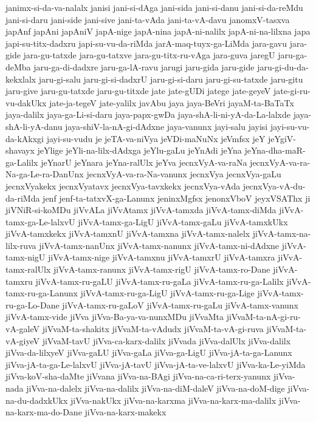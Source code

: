{janimx-si-da-va-nalalx
janisi
jani-si-dAga
jani-sida
jani-si-danu
jani-si-da-reMdu
jani-si-daru
jani-side
jani-sive
jani-ta-vAda
jani-ta-vA-davu
janomxV-tasxva
japAnf
japAni
japAniV
japA-nige
japA-nina
japA-ni-nalilx
japA-ni-na-lilxna
japa
japi-su-titx-dadxru
japi-su-vu-da-riMda
jarA-maq-tuyx-ga-LiMda
jara-gavu
jara-gide
jara-gu-tatxde
jara-gu-tatxve
jara-gu-titx-ru-vAga
jara-guva
jaregU
jaru-ga-deMba
jaru-ga-di-dadxre
jaru-ga-lA-ravu
jarugi
jaru-gida
jaru-gide
jaru-gi-du-da-kekxlalx
jaru-gi-salu
jaru-gi-si-dadxrU
jaru-gi-si-daru
jaru-gi-su-tatxde
jaru-gitu
jaru-give
jaru-gu-tatxde
jaru-gu-titxde
jate
jate-gUDi
jatege
jate-geyeV
jate-gi-ru-vu-dakUkx
jate-ja-tegeV
jate-yalilx
javAbu
jaya
jaya-BeVri
jayaM-ta-BaTaTx
jaya-dalilx
jaya-ga-Li-si-daru
jaya-papx-gwDa
jaya-shA-li-ni-yA-da-La-lalxde
jaya-shA-li-yA-danu
jaya-shiV-la-nA-gi-dAdxne
jaya-vanunx
jayi-salu
jayisi
jayi-su-vu-da-kAkxgi
jayi-su-vudu
je
jeTA-va-niVya
jeVDi-maNuNx
jeVmfsx
jeY
jeYgiV-shavayx
jeYlige
jeYli-na-lilx-dAdxga
jeYlu-gaLu
jeYnAdi
jeYna
jeYna-dha-maR-ga-Lalilx
jeYnarU
jeYnara
jeYna-ralUlx
jeYva
jecnxVyA-va-raNa
jecnxVyA-va-ra-Na-ga-Le-ra-DanUnx
jecnxVyA-va-ra-Na-vanunx
jecnxVya
jecnxVya-gaLu
jecnxVyakekx
jecnxVyatavx
jecnxVya-tavxkekx
jecnxVya-vAda
jecnxVya-vA-du-da-riMda
jenf
jenf-ta-tatxvX-ga-Lanunx
jeninxMgfsx
jenonxVboV
jeyxVSAThx
ji
jiVNiR-si-koMDu
jiVvALa
jiVvAtamx
jiVvA-tamxda
jiVvA-tamx-diMda
jiVvA-tamx-ga-Le-lalxvU
jiVvA-tamx-ga-LigU
jiVvA-tamx-gaLu
jiVvA-tamxkUkx
jiVvA-tamxkekx
jiVvA-tamxnU
jiVvA-tamxna
jiVvA-tamx-nalelx
jiVvA-tamx-na-lilx-ruva
jiVvA-tamx-nanUnx
jiVvA-tamx-nanunx
jiVvA-tamx-ni-dAdxne
jiVvA-tamx-nigU
jiVvA-tamx-nige
jiVvA-tamxnu
jiVvA-tamxrU
jiVvA-tamxra
jiVvA-tamx-ralUlx
jiVvA-tamx-ranunx
jiVvA-tamx-rigU
jiVvA-tamx-ro-Dane
jiVvA-tamxru
jiVvA-tamx-ru-gaLU
jiVvA-tamx-ru-gaLa
jiVvA-tamx-ru-ga-Lalilx
jiVvA-tamx-ru-ga-Lanunx
jiVvA-tamx-ru-ga-LigU
jiVvA-tamx-ru-ga-Lige
jiVvA-tamx-ru-ga-Lo-Dane
jiVvA-tamx-ru-gaLoV
jiVvA-tamx-ru-gaLu
jiVvA-tamx-vanunx
jiVvA-tamx-vide
jiVva
jiVva-Ba-ya-va-nunxMDu
jiVvaMta
jiVvaM-ta-nA-gi-ru-vA-galeV
jiVvaM-ta-shakitx
jiVvaM-ta-vAdudx
jiVvaM-ta-vA-gi-ruva
jiVvaM-ta-vA-giyeV
jiVvaM-tavU
jiVva-ca-karx-dalilx
jiVvada
jiVva-dalUlx
jiVva-dalilx
jiVva-da-lilxyeV
jiVva-gaLU
jiVva-gaLa
jiVva-ga-LigU
jiVva-jA-ta-ga-Lanunx
jiVva-jA-ta-ga-Le-lalxvU
jiVva-jA-tavU
jiVva-jA-ta-ve-lalxvU
jiVva-ka-Le-yiMda
jiVva-koV-sha-daMte
jiVvana
jiVva-na-BAgi
jiVva-na-ca-ri-terx-yanunx
jiVva-nada
jiVva-na-dalelx
jiVva-na-dalilx
jiVva-na-diM-daleV
jiVva-na-doM-dige
jiVva-na-du-dadxkUkx
jiVva-nakUkx
jiVva-na-karxma
jiVva-na-karx-ma-dalilx
jiVva-na-karx-ma-do-Dane
jiVva-na-karx-makekx
}
